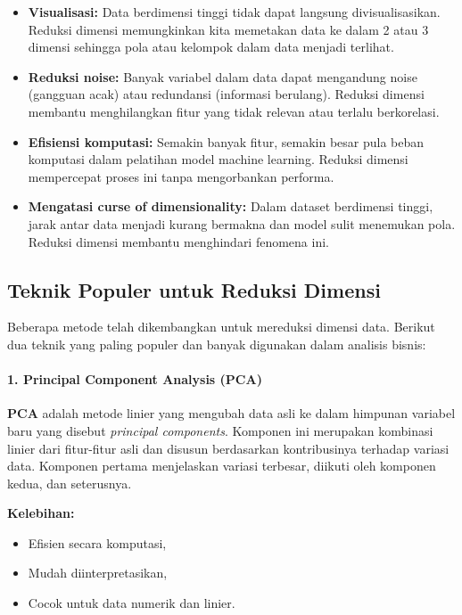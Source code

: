 \begin{itemize}
	\item \textbf{Visualisasi:} Data berdimensi tinggi tidak dapat langsung divisualisasikan. Reduksi dimensi memungkinkan kita memetakan data ke dalam 2 atau 3 dimensi sehingga pola atau kelompok dalam data menjadi terlihat.
	
	\item \textbf{Reduksi noise:} Banyak variabel dalam data dapat mengandung noise (gangguan acak) atau redundansi (informasi berulang). Reduksi dimensi membantu menghilangkan fitur yang tidak relevan atau terlalu berkorelasi.
	
	\item \textbf{Efisiensi komputasi:} Semakin banyak fitur, semakin besar pula beban komputasi dalam pelatihan model machine learning. Reduksi dimensi mempercepat proses ini tanpa mengorbankan performa.
	
	\item \textbf{Mengatasi curse of dimensionality:} Dalam dataset berdimensi tinggi, jarak antar data menjadi kurang bermakna dan model sulit menemukan pola. Reduksi dimensi membantu menghindari fenomena ini.
\end{itemize}

\subsection*{Teknik Populer untuk Reduksi Dimensi}

Beberapa metode telah dikembangkan untuk mereduksi dimensi data. Berikut dua teknik yang paling populer dan banyak digunakan dalam analisis bisnis:

\paragraph{1. Principal Component Analysis (PCA)}

\textbf{PCA} adalah metode linier yang mengubah data asli ke dalam himpunan variabel baru yang disebut \textit{principal components}. Komponen ini merupakan kombinasi linier dari fitur-fitur asli dan disusun berdasarkan kontribusinya terhadap variasi data. Komponen pertama menjelaskan variasi terbesar, diikuti oleh komponen kedua, dan seterusnya.

\textbf{Kelebihan:}
\begin{itemize}
	\item Efisien secara komputasi,
	\item Mudah diinterpretasikan,
	\item Cocok untuk data numerik dan linier.
\end{itemize}

